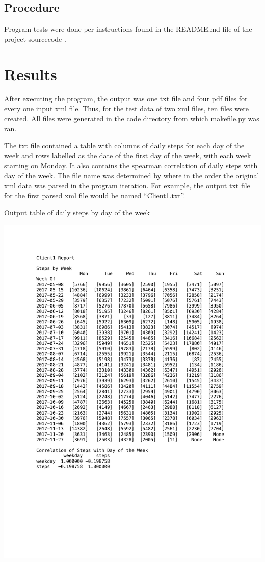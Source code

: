 \documentclass[sigconf]{acmart}
\begin{document}
\subsection{Procedure}

Program tests were done per instructions found in the README.md file of the project sourcecode \cite{sourcecode}.

\section{Results}
After executing the program, the output was one txt file and four pdf files for every one input xml file. Thus, for the test data of two xml files, ten files were created. All files were generated in the code directory from which makefile.py was ran. 

The txt file contained a table with columns of daily steps for each day of the week and rows labelled as the date of the first day of the week, with each week starting on Monday. It also contains the spearman correlation of daily steps with day of the week. The file name was determined by where in the order the original xml data was parsed in the program iteration. For example, the output txt file for the first parsed xml file would be named ``Client1.txt''.

\begin{table}[htb]
\caption{Output table of daily steps by day of the week}
\includegraphics[width=\columnwidth]{images/Client1.pdf}
\end{table}
\end{document}
